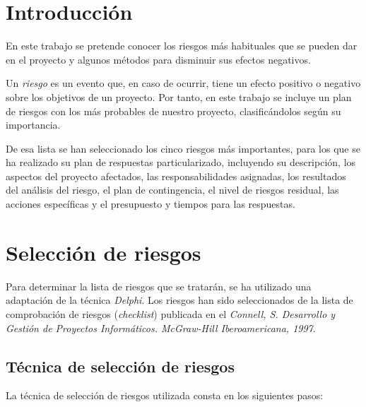 \documentclass[11pt,a4paper,spanish,twoside]{report}
\begin{document}
\tableofcontents
\listoftables
\listoffigures


\chapter*{Introducción}

En este trabajo se pretende conocer los riesgos más habituales que se pueden 
dar en el proyecto y algunos métodos para disminuir sus efectos negativos.

Un \emph{riesgo} es un evento que, en caso de ocurrir, tiene un efecto
positivo o negativo sobre los objetivos de un proyecto. Por tanto, en este
trabajo se incluye un plan de riesgos con los más probables de nuestro
proyecto, clasificándolos según su importancia.

De esa lista se han seleccionado los cinco riesgos más importantes, para los
que se ha realizado su plan de respuestas particularizado, incluyendo su 
descripción, los aspectos del proyecto afectados, las responsabilidades 
asignadas, los resultados del análisis del riesgo, el plan de contingencia,
el nivel de riesgos residual, las acciones específicas y el presupuesto y 
tiempos para las respuestas.

\chapter{Selección de riesgos}
Para determinar la lista de riesgos que se tratarán, se ha utilizado una
adaptación de la técnica \emph{Delphi}. Los riesgos han sido seleccionados de
la lista de comprobación de riesgos (\emph{checklist}) publicada en el 
\emph{Connell, S. Desarrollo y Gestión de Proyectos Informáticos. McGraw-Hill
Iberoamericana, 1997}.

\section{Técnica de selección de riesgos}
La técnica de selección de riesgos utilizada consta en los siguientes pasos:
\end{document}
